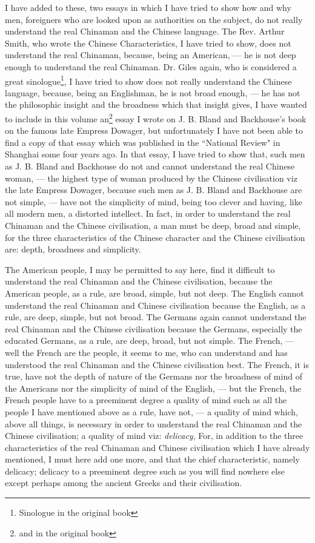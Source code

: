 I have added to these, two essays in which I have tried to show how and why men, foreigners who are looked upon as authorities on the subject, do not really understand the real Chinaman and the Chinese language.
The Rev. Arthur Smith, who wrote the Chinese Characteristics, I have tried to show, does not understand the real Chinaman, because, being an American, --- he is not deep enough to understand the real Chinaman.
Dr. Giles again, who is considered a great sinologue\footnote{Sinologue in the original book}, I have tried to show does not really understand the Chinese language, because, being an Englishman, he is not broad enough, --- he has not the philosophic insight and the broadness which that insight gives, I have wanted to include in this volume an\footnote{and in the original book} essay I wrote on J. B. Bland and Backhouse's book on the famous late Empress Dowager, but unfortunately I have not been able to find a copy of that essay which was published in the ``National Review" in Shanghai some four years ago.
In that essay, I have tried to show that, such men as J. B. Bland and Backhouse do not and cannot understand the real Chinese woman, --- the highest type of woman produced by the Chinese civilisation viz the late Empress Dowager, because such men as J. B. Bland and Backhouse are not simple, --- have not the simplicity of mind, being too clever and having, like all modern men, a distorted intellect\cite{num1}. 
In fact, in order to understand the real Chinaman and the Chinese civilisation, a man must be deep, broad and simple, for the three characteristics of the Chinese character and the Chinese civilisation are: depth, broadness and simplicity.

The American people, I may be permitted to say here, find it difficult to understand the real Chinaman and the Chinese civilisation, because the American people, as a rule, are broad, simple, but not deep.
The English cannot understand the real Chinaman and Chinese civilisation because the English, as a rule, are deep, simple, but not broad.
The Germans again cannot understand the real Chinaman and the Chinese civilisation because the Germans, especially the educated Germans, as a rule, are deep, broad, but not simple.
The French, --- well the French are the people, it seems to me, who can understand and has understood the real Chinaman and the Chinese civilisation best\cite{num2}. 
The French, it is true, have not the depth of nature of the Germans nor the broadness of mind of the Americans nor the simplicity of mind of the English, --- but the French, the French people have to a preeminent degree a quality of mind such as all the people I have mentioned above as a rule, have not, --- a quality of mind which, above all things, is necessary in order to understand the real Chinaman and the Chinese civilisation; a quality of mind viz: \emph{delicacy}, For, in addition to the three characteristics of the real Chinaman and Chinese civilisation which I have already mentioned, I must here add one more, and that the chief characteristic, namely delicacy; delicacy to a preeminent  degree such as you will find nowhere else except perhaps among the ancient Greeks and their civilisation.

